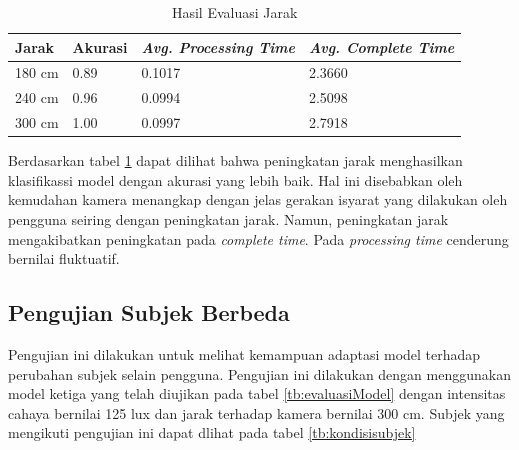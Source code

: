 \begin{table}[H]
  \caption{Hasil Evaluasi Jarak}
  \label{tb:evaluasiJarak}
  \centering
  \begin{tabular}{llll}
    \hline
    \textbf{Jarak} & \textbf{Akurasi} & \emph{\textbf{Avg. Processing Time}} & \emph{\textbf{Avg. Complete Time}} \\
    \hline
    180 cm & 0.89 & 0.1017 & 2.3660 \\
    240 cm & 0.96 & 0.0994 & 2.5098 \\
    300 cm & 1.00 & 0.0997 & 2.7918 \\
    \hline
  \end{tabular}
\end{table}

Berdasarkan tabel \ref{tb:evaluasiJarak} dapat dilihat bahwa peningkatan jarak menghasilkan klasifikassi model dengan akurasi yang lebih baik. Hal ini disebabkan oleh kemudahan kamera menangkap dengan jelas gerakan isyarat yang dilakukan oleh pengguna seiring dengan peningkatan jarak. Namun, peningkatan jarak mengakibatkan peningkatan pada \emph{complete time}. Pada \emph{processing time} cenderung bernilai fluktuatif.

\subsection{Pengujian Subjek Berbeda}
\label{sec:analisissubjek}

Pengujian ini dilakukan untuk melihat kemampuan adaptasi model terhadap perubahan subjek selain pengguna. Pengujian ini dilakukan dengan menggunakan model ketiga yang telah diujikan pada tabel \ref{tb:evaluasiModel} dengan intensitas cahaya bernilai 125 lux dan jarak terhadap kamera bernilai 300 cm. Subjek yang mengikuti pengujian ini dapat dlihat pada tabel \ref{tb:kondisisubjek}

